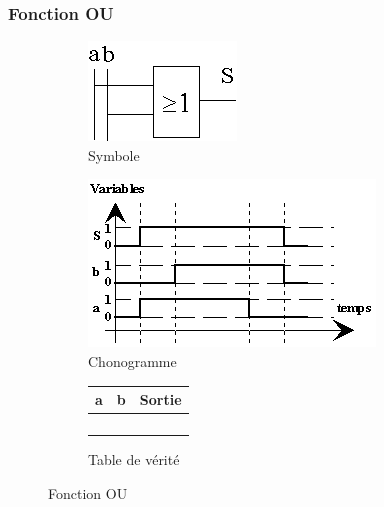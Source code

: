 \documentclass[10pt,fleqn]{article} %
\begin{document}
\subsubsection{Fonction OU}
\begin{figure}[ht]
  \begin{subfigure}{.2\textwidth}
    \includegraphics[width=\textwidth]{images/ou_symb}
    \caption{Symbole}
    \centering
  \end{subfigure}
  \begin{subfigure}{.4\textwidth}
    \centering
    \includegraphics[width=\textwidth]{images/ou_chrono}
    \caption{Chonogramme}
  \end{subfigure}
  \begin{subfigure}{.33\textwidth}
    \centering
    \begin{tabular}{|c|c|c|}
      \hline
      \textbf{a}&  \textbf{b}& \textbf{Sortie} \\
      \hline
       & & \\ \hline
       & & \\ \hline
       & & \\ \hline
       & & \\ \hline
    \end{tabular}
    \caption{Table de vérité}
  \end{subfigure}
  \caption{Fonction OU}
\end{figure}
\end{document}
